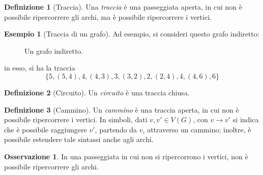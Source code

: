 \documentclass[14pt]{extreport}
\theoremstyle{definition}
\newtheorem{definition}{Definizione}[subsection]
\theoremstyle{definition}
\newtheorem{remark}{Osservazione}[subsection]
\newtheorem{example}{Esempio}[subsection]
\begin{document}
\begin{definition}[Traccia]
    Una \textit{traccia} è una passeggiata aperta, in cui non è possibile ripercorrere gli archi, ma è possibile ripercorrere i vertici.
\end{definition}

\begin{example}[Traccia di un grafo]
    Ad esempio, si consideri questo grafo indiretto:

    \begin{figure}[H]
        \centering
        \caption{Un grafo indiretto.}
    \end{figure}

    in esso, si ha la traccia $$\{5, (5,4), 4, (4,3), 3, (3, 2), 2, (2,4), 4, (4, 6), 6\}$$
\end{example}

\begin{definition}[Circuito]
    Un \textit{circuito} è una traccia chiusa.
\end{definition}

\begin{definition}[Cammino]
    Un \textit{cammino} è una traccia aperta, in cui non è possibile ripercorrere i vertici. In simboli, dati $v, v' \in V(G)$, con $v \rightarrow v'$ si indica che è possibile raggiungere $v'$, partendo da $v$, attraverso un cammino; inoltre, è possibile estendere tale sintassi anche agli archi.
\end{definition}

\begin{remark}
    In una passeggiata in cui non si ripercorrono i vertici, non è possibile ripercorrere gli archi.
\end{remark}
\end{document}
